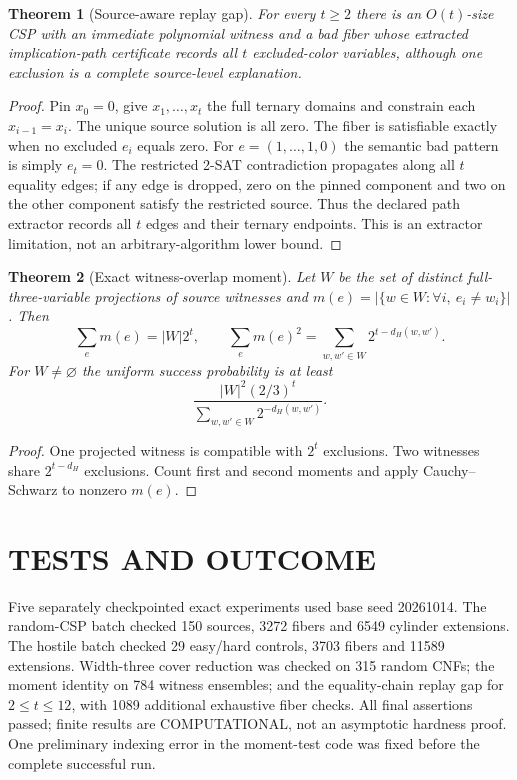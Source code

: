 \documentclass[11pt]{article}
\newtheorem{theorem}{Theorem}
\begin{document}
\begin{theorem}[Source-aware replay gap]
For every $t\ge2$ there is an $O(t)$-size CSP with an immediate polynomial witness and a bad fiber whose extracted implication-path certificate records all $t$ excluded-color variables, although one exclusion is a complete source-level explanation.
\end{theorem}
\begin{proof}
Pin $x_0=0$, give $x_1,\ldots,x_t$ the full ternary domains and constrain each $x_{i-1}=x_i$. The unique source solution is all zero. The fiber is satisfiable exactly when no excluded $e_i$ equals zero. For $e=(1,\ldots,1,0)$ the semantic bad pattern is simply $e_t=0$. The restricted 2-SAT contradiction propagates along all $t$ equality edges; if any edge is dropped, zero on the pinned component and two on the other component satisfy the restricted source. Thus the declared path extractor records all $t$ edges and their ternary endpoints. This is an extractor limitation, not an arbitrary-algorithm lower bound.
\end{proof}

\begin{theorem}[Exact witness-overlap moment]
Let $W$ be the set of distinct full-three-variable projections of source witnesses and $m(e)=|\{w\in W:\forall i,\ e_i\ne w_i\}|$. Then
\[
\sum_e m(e)=|W|2^t,\qquad
\sum_e m(e)^2=\sum_{w,w'\in W}2^{t-d_H(w,w')}.
\]
For $W\ne\varnothing$ the uniform success probability is at least
\[
\frac{|W|^2(2/3)^t}{\sum_{w,w'\in W}2^{-d_H(w,w')}}.
\]
\end{theorem}
\begin{proof}
One projected witness is compatible with $2^t$ exclusions. Two witnesses share $2^{t-d_H}$ exclusions. Count first and second moments and apply Cauchy--Schwarz to nonzero $m(e)$.
\end{proof}

\section{TESTS AND OUTCOME}
Five separately checkpointed exact experiments used base seed 20261014. The random-CSP batch checked 150 sources, 3272 fibers and 6549 cylinder extensions. The hostile batch checked 29 easy/hard controls, 3703 fibers and 11589 extensions. Width-three cover reduction was checked on 315 random CNFs; the moment identity on 784 witness ensembles; and the equality-chain replay gap for $2\le t\le12$, with 1089 additional exhaustive fiber checks. All final assertions passed; finite results are COMPUTATIONAL, not an asymptotic hardness proof. One preliminary indexing error in the moment-test code was fixed before the complete successful run.
\end{document}
